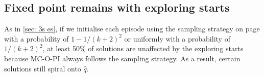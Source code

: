 


\subsection{Fixed point remains with exploring starts}

As in \autoref{sec: 3s es},
if we initialise each episode using the sampling strategy on page \pageref{pg: sampling 4 state} with a probability of $1-1/(k+2)^2$ or uniformly with a probability of $1/(k+2)^2$, at least 50\% of solutions are unaffected by the exploring starts because MC-O-PI always follows the sampling strategy.
As a result, certain solutions still spiral onto $\hat{q}$.




